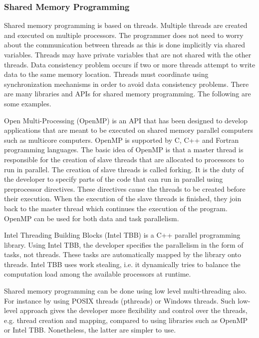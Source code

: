 \subsubsection{Shared Memory Programming}

Shared memory programming is based on threads. Multiple threads are created and executed on multiple processors. The programmer does not need to worry about the communication between threads as this is done implicitly via shared variables. Threads may have private variables that are not shared with the other threads. Data consistency problem occurs if two or more threads attempt to write data to the same memory location. Threads must coordinate using synchronization mechanisms in order to avoid data consistency problems. There are many libraries and APIs for shared memory programming. The following are some examples.

Open Multi-Processing (OpenMP) \cite{openmp} is an API that has been designed to develop applications that are meant to be executed on shared memory parallel computers such as multicore computers. OpenMP is supported by C, C++ and Fortran programming languages. The basic idea of OpenMP is that a master thread is responsible for the creation of slave threads that are allocated to processors to run in parallel. The creation of slave threads is called forking. It is the duty of the developer to specify parts of the code that can run in parallel using preprocessor directives. These directives cause the threads to be created before their execution. When the execution of the slave threads is finished, they join back to the master thread which continues the execution of the program. OpenMP can be used for both data and task parallelism.

Intel Threading Building Blocks (Intel TBB) is a C++ parallel programming library. Using Intel TBB, the developer specifies the parallelism in the form of tasks, not threads. These tasks are automatically mapped by the library onto threads. Intel TBB uses work stealing, i.e. it dynamically tries to balance the computation load among the available processors at runtime.

Shared memory programming can be done using low level multi-threading also. For instance by using POSIX threads (pthreads) or Windows threads. Such low-level approach gives the developer more flexibility and control over the threads, e.g. thread creation and mapping, compared to using libraries such as OpenMP or Intel TBB. Nonetheless, the latter are simpler to use. 

